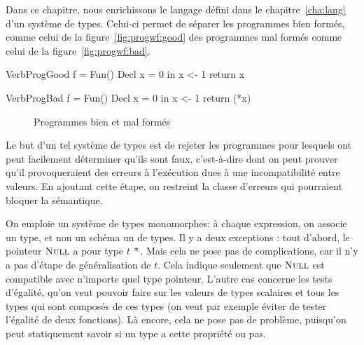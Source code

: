 Dans ce chapitre, nous enrichissons le langage défini dans le
chapitre~\ref{cha:lang} d'un système de types. Celui-ci permet de séparer les
programmes bien formés, comme celui de la figure~\ref{fig:progwf:good} des
programmes mal formés comme celui de la figure~\ref{fig:progwf:bad}.

\begin{SaveVerbatim}[]{VerbProgGood}
f = Fun() {
  Decl x = 0 in
  x <- 1
  return x
}
\end{SaveVerbatim}

\begin{SaveVerbatim}[]{VerbProgBad}
f = Fun() {
  Decl x = 0 in
  x <- 1
  return (*x)
}
\end{SaveVerbatim}

\begin{figure}[h]

  \centering

  \hspace{2cm}

  \caption{Programmes bien et mal formés}
\label{fig:progwf}

\end{figure}

Le but d'un tel système de types est de rejeter les programmes pour lesquels ont
peut facilement déterminer qu'ils sont faux, c'est-à-dire dont on peut prouver
qu'il provoqueraient des erreurs à l'exécution dues à une incompatibilité entre
valeurs. En ajoutant cette étape, on restreint la classe d'erreurs qui
pourraient bloquer la sémantique.

On emploie un système de types monomorphes: à chaque expression, on associe un
type, et non un schéma un de types. Il y a deux exceptions : tout d'abord, le
pointeur $\textsc{Null}$ a pour type $t~*$. Mais cela ne pose pas de complications, car
il n'y a pas d'étape de généralisation de $t$. Cela indique seulement que
$\textsc{Null}$ est compatible avec n'importe quel type pointeur. L'autre cas concerne
les tests d'égalité, qu'on veut pouvoir faire sur les valeurs de types scalaires
et tous les types qui sont composés de ces types (on veut par exemple éviter de
tester l'égalité de deux fonctions). Là encore, cela ne pose pas de problème,
puisqu'on peut statiquement savoir si un type a cette propriété ou pas.

